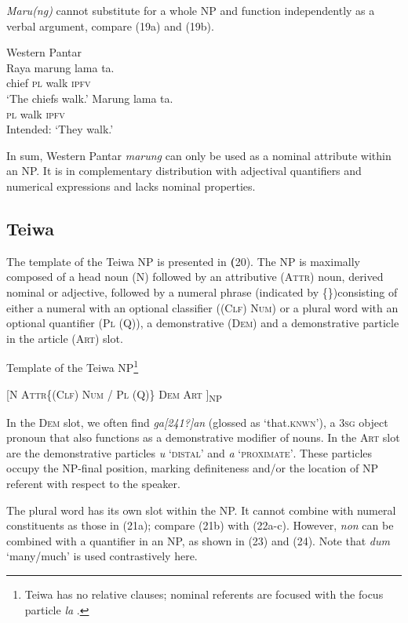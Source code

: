 \textit{Maru(ng)} cannot substitute for a whole NP and function independently as a verbal argument, compare (19a) and (19b).


\ea%
\label{ex:19}
Western Pantar \citep{Holton2012}\\
\ea
\gll  Raya marung lama ta. \\
   chief \textsc{pl} walk \textsc{ipfv}  \\
\glt `The chiefs walk.'
\ex
\gll *Marung lama ta. \\
  \textsc{pl} walk \textsc{ipfv}  \\
\glt Intended: `They walk.'
\z
\z


 In sum, Western Pantar \textit{marung} can only be used as a nominal attribute within an NP. It is in complementary distribution with adjectival quantifiers and numerical expressions and lacks nominal properties.

\subsection{Teiwa} %
The template of the Teiwa NP is presented in \textbf{(}20). The NP is maximally composed of a head noun (N) followed by an attributive (\textsc{Attr)} noun, derived nominal or adjective\textsc{,} followed by a numeral phrase (indicated by \{\})consisting of either a numeral with an optional classifier (\textsc{(Clf)} \textsc{Num)} or a plural word with an optional quantifier (\textsc{Pl} \textsc{(Q)),} a demonstrative \textsc{(Dem)} and a demonstrative particle in the article (\textsc{Art)} slot.

\ea%
\label{ex:20}

 Template of the Teiwa NP\footnote{Teiwa has no relative clauses; nominal referents are focused with the focus particle \textit{la} \citep{Klamer2010}.}

 [\textsc{N  Attr\{(Clf) Num / Pl (Q)\}  Dem Art ]}\textsc{\textsubscript{NP}}
\z

In the \textsc{Dem} slot, we often find \textit{ga}\textit{[241?]}\textit{an} (glossed as `that.\textsc{knwn}'), a 3\textsc{sg} object pronoun that also functions as a demonstrative modifier of nouns. In the \textsc{Art} slot are the demonstrative particles \textit{u} `\textsc{distal'} and \textit{a} `\textsc{proximate'}. These particles occupy the NP-final position, marking definiteness and/or the location of NP referent with respect to the speaker.

The plural word has its own slot within the NP. It cannot combine with numeral constituents as those in (21a); compare (21b) with (22a-c). However, \textit{non} can be combined with a quantifier in an NP, as shown in (23) and (24). Note that \textit{dum} `many/much' is used contrastively here.


